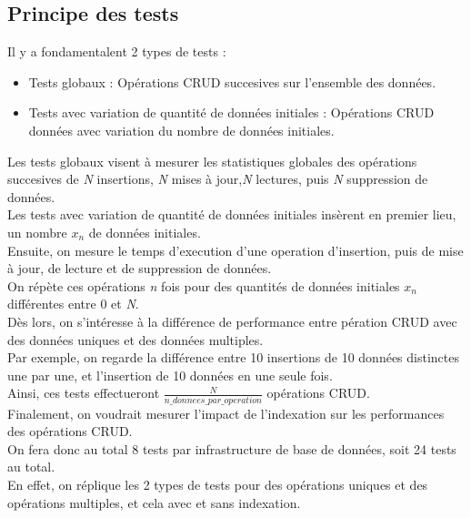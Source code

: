 \documentclass[12pt,a4paper]{report}
\begin{document}
    \subsection{Principe des tests}
        \begin{card}
            Il y a fondamentalent 2 types de tests :
            \begin{itemize}
                \item Tests globaux :  Opérations CRUD succesives sur l'ensemble des données.
                \item Tests avec variation de quantité de données initiales : Opérations CRUD données avec variation du nombre de données initiales.
            \end{itemize}

            Les tests globaux visent à mesurer les statistiques globales des opérations succesives de \textit{N} insertions, \textit{N} mises à jour,\textit{N} lectures, puis \textit{N} suppression de données. \\
            Les tests avec variation de quantité de données initiales insèrent en premier lieu, un nombre $ x_n $  de données initiales. \\
            Ensuite, on mesure le temps d'execution d'une operation d'insertion, puis de mise à jour, de lecture et de suppression de données. \\
            On répète ces opérations \textit{n} fois pour des quantités de données initiales $ x_n $ différentes entre 0 et \textit{N}. \\

            Dès lors, on s'intéresse à la différence de performance entre pération CRUD avec des données uniques et des données multiples. \\
            Par exemple, on regarde la différence entre 10 insertions de 10 données distinctes une par une, et l'insertion de 10 données en une seule fois. \\
            Ainsi, ces tests effectueront  $ \frac{N}{n\_donnees\_par\_operation} $ opérations CRUD. \\

            Finalement, on voudrait mesurer l'impact de l'indexation sur les performances des opérations CRUD. \\

            On fera donc au total 8 tests par infrastructure de base de données, soit 24 tests au total. \\
            En effet, on réplique les 2 types de tests pour des opérations uniques et des opérations multiples, et cela avec et sans indexation. \\
            \end{card}
\end{document}
